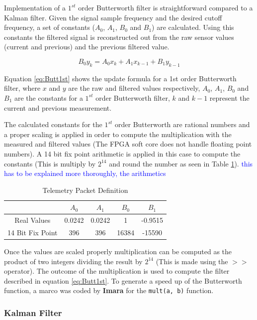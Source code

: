 \documentclass{article}
\newcommand\todo[1]{\textcolor{blue}{#1}} %
\begin{document}
Implementation of a $1^{st}$ order Butterworth filter is straightforward compared to a Kalman filter. Given the signal sample frequency and the desired cutoff frequency, a set of constants ($A_0$, $A_1$, $B_0$ and $B_1$) are calculated. Using this constants the filtered signal is reconstructed out from the raw sensor values (current and previous) and the previous filtered value.

\begin{equation}
	 B_0 y_k = A_0 x_k + A_1 x_{k-1} + B_1 y_{k-1}
	 \label{eq:Butt1st}
\end{equation}

Equation \ref{eq:Butt1st} shows the update formula for a 1st order Butterworth filter, where $x$ and $y$ are the raw and filtered values respectively, $A_0$, $A_1$, $B_0$ and $B_1$ are the constants for a $1^{st}$ order Butterworth filter, $k$ and $k-1$ represent the current and previous measurement.

The calculated constants for the $1^{st}$ order Butterworth are rational numbers and a proper scaling is applied in order to compute the multiplication with the measured and filtered values (The FPGA soft core does not handle floating point numbers). A 14 bit fix point arithmetic is applied in this case to compute the constants (This is multiply by $2^{14}$ and round the number as seen in Table \ref{tbl:ButtConstants}). \todo{this has to be explained more thoroughly, the arithmetics}

\begin{table}[ht]
\centering
\caption{Telemetry Packet Definition}
\begin{tabular}{|c|c|c|c|c|}
\hline 
 & $A_0$ & $A_1$ & $B_0$ & $B_1$ \\ 
\hline 
Real Values & 0.0242 & 0.0242 & 1 & -0.9515 \\ 
\hline 
14 Bit Fix Point & 396 & 396 & 16384 & -15590 \\ 
\hline 
\end{tabular}
\label{tbl:ButtConstants}
\end{table}

Once the values are scaled properly multiplication can be computed as the product of two integers dividing the result by $2^{14}$ (This is made using the $>>$ operator). The outcome of the multiplication is used to compute the filter described in equation \ref{eq:Butt1st}. To generate a speed up of the Butterworth function, a marco was coded by \textbf{Imara} for the \texttt{mult(a, b)} function. 

\subsubsection{Kalman Filter}
\end{document}
